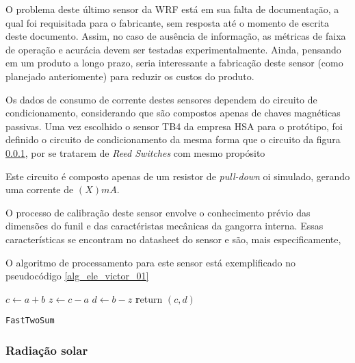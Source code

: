 			O problema deste último sensor da WRF está em sua falta de documentação, a qual foi requisitada para o fabricante, sem resposta até o momento de escrita deste documento. Assim, no caso de ausência de informação, as métricas de faixa de operação e acurácia devem ser testadas experimentalmente. Ainda, pensando em um produto a longo prazo, seria interessante a fabricação deste sensor (como planejado anteriomente) para reduzir os custos do produto.

			Os dados de consumo de corrente destes sensores dependem do circuito de condicionamento, considerando que são compostos apenas de chaves magnéticas passivas. Uma vez escolhido o sensor TB4 da empresa HSA para o protótipo, foi definido o circuito de condicionamento da mesma forma que o circuito da figura \ref{}, por se tratarem de \emph{Reed Switches} com mesmo propósito

			Este circuito é composto apenas de um resistor de \emph{pull-down}
			oi simulado, gerando uma corrente de $(X) mA$.

			O processo de calibração deste sensor envolve o conhecimento prévio das dimensões do funil e das caractéristas mecânicas da gangorra interna. Essas características se encontram no datasheet do sensor e são, mais especificamente, 

			O algoritmo de processamento para este sensor está exemplificado no pseudocódigo \ref{alg_ele_victor_01}

			\begin{center}
				\begin{minipage}{0.5\linewidth} %
					\begin{algorithm}[H]
						\label{alg_ele_victor_01}
						\medskip
						$c \leftarrow a + b$ \;
						$z \leftarrow c - a$ \;
						$d \leftarrow b - z$ \;
						{\textbf return} $(c,d)$ \;
						\caption{\texttt{FastTwoSum}} %
						\label{alg:fastTwoSum}   %
					\end{algorithm}
				\end{minipage}
			\end{center}

		\subsubsection{Radiação solar}
		
